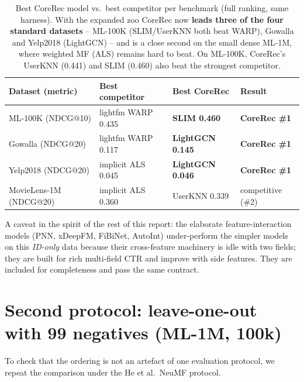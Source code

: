 \documentclass[10pt]{article}
\begin{document}
\begin{table}[h]\centering\small
\begin{tabular}{llll}
\toprule
Dataset (metric) & Best competitor & \textbf{Best CoreRec} & Result \\
\midrule
ML-100K (NDCG@10) & lightfm WARP 0.435 & \textbf{SLIM 0.460} & \textbf{CoreRec \#1} \\
Gowalla (NDCG@20) & lightfm WARP 0.117 & \textbf{LightGCN 0.145} & \textbf{CoreRec \#1} \\
Yelp2018 (NDCG@20) & implicit ALS 0.045 & \textbf{LightGCN 0.046} & \textbf{CoreRec \#1} \\
MovieLens-1M (NDCG@20) & implicit ALS 0.360 & UserKNN 0.339 & competitive (\#2) \\
\bottomrule
\end{tabular}
\caption{Best CoreRec model vs.\ best competitor per benchmark (full ranking, same
harness). With the expanded zoo CoreRec now \textbf{leads three of the four standard
datasets} -- ML-100K (SLIM/UserKNN both beat WARP), Gowalla and Yelp2018
(LightGCN) -- and is a close second on the small dense ML-1M, where weighted MF
(ALS) remains hard to beat. On ML-100K, CoreRec's UserKNN (0.441) and SLIM (0.460)
also beat the strongest competitor.}
\label{tab:zoo}
\end{table}

A caveat in the spirit of the rest of this report: the elaborate
feature-interaction models (PNN, xDeepFM, FiBiNet, AutoInt) under-perform the
simpler models on this \emph{ID-only} data because their cross-feature machinery is
idle with two fields; they are built for rich multi-field CTR and improve with side
features. They are included for completeness and pass the same contract.

\section{Second protocol: leave-one-out with 99 negatives (ML-1M, 100k)}
\label{sec:loo}
To check that the ordering is not an artefact of one evaluation protocol, we
repeat the comparison under the He et al.\ NeuMF protocol.
\end{document}
